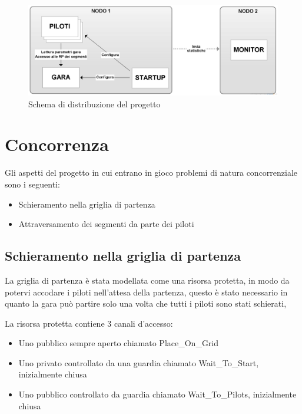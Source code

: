 \documentclass[a4paper,11pt, twoside]{book}
\begin{document}
      \begin{figure}[h]
	\centering
	\includegraphics[width=120mm]{./Immagini/SchemaDistribuzione.png}
	\caption{Schema di distribuzione del progetto}
	\label{Fig:SchemaDistribuzione}
      \end{figure}
  
    
  \chapter{Concorrenza}
  \label{Concorenza}
    Gli aspetti del progetto in cui entrano in gioco problemi di natura concorrenziale sono i seguenti:
    
    \begin{itemize}
      \item Schieramento nella griglia di partenza
      \item Attraversamento dei segmenti da parte dei piloti
    \end{itemize}
    
    \section{Schieramento nella griglia di partenza}
    \label{Schieramento nella griglia di partenza}
      La griglia di partenza è stata modellata come una risorsa protetta, in modo da potervi accodare i piloti
      nell'attesa della partenza, questo è stato necessario in quanto la gara può partire solo una volta che tutti i piloti sono stati schierati,
      
      La risorsa protetta contiene 3 canali d'accesso:
      \begin{itemize}
	\item Uno pubblico sempre aperto chiamato Place\_On\_Grid
	\item Uno privato controllato da una guardia chiamato  Wait\_To\_Start, inizialmente chiusa
	\item Uno pubblico controllato da guardia chiamato Wait\_To\_Pilots, inizialmente chiusa
      \end{itemize}
      
\end{document}
